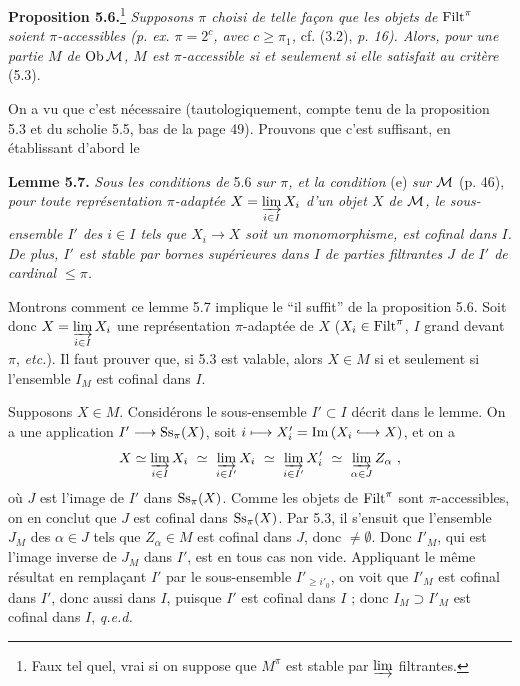 \textbf{Proposition 5.6.}\footnote[21]{Faux tel quel, vrai si on suppose que $M^{\pi}$ est stable par $\varinjlim$ filtrantes.} \textit{Supposons $\pi$ choisi de telle façon que les objets de} $\mathrm{Filt}^{\pi}$ \textit{soient $\pi$-accessibles (p. ex. $\pi = 2^{c}$, avec $c \geq \pi_1$,} cf. (3.2), \textit{p. 16). Alors, pour une partie $M$ de} $\operatorname{Ob}\mathcal{M}$\textit{, $M$ est $\pi$-accessible si et seulement si elle satisfait au critère} (5.3).

On a vu que c'est nécessaire (tautologiquement, compte tenu de la proposition 5.3 et du scholie 5.5, bas de la page 49). Prouvons que c'est suffisant, en établissant d'abord le

\textbf{Lemme 5.7.} \textit{Sous les conditions de} 5.6 \textit{sur $\pi$, et la condition} (e) \textit{sur $\mathcal{M}$} (p. 46), \textit{pour toute représentation $\pi$-adaptée $X = \varinjlim\limits_{i\in I} X_i$ d'un objet $X$ de $\mathcal{M}$, le sous-ensemble $I'$ des $i \in I$ tels que $X_i \longrightarrow X$ soit un monomorphisme, est cofinal dans $I$. De plus, $I'$ est stable par bornes supérieures dans $I$ de parties filtrantes $J$ de $I'$ de cardinal $\leq \pi$.}

Montrons comment ce lemme 5.7 implique le ``il suffit'' de la proposition 5.6. Soit donc $X = \varinjlim\limits_{i\in I} X_i$ une représentation $\pi$-adaptée de $X$ ($X_i \in \mathrm{Filt}^{\pi}$, $I$ grand devant $\pi$, \textit{etc.}). Il faut prouver que, si 5.3 est valable, alors $X \in M$ si et seulement si l'ensemble $I_M$ est cofinal dans $I$.

Supposons $X \in M$. Considérons le sous-ensemble $I' \subset I$ décrit dans le lemme. On a une application $I' \longrightarrow \mathrm{Ss}_{\pi}(X)$, soit $i \longmapsto X'_i = \Img (X_i \hookto X)$, et on a
\[
X \simeq \varinjlim_{i\in I} X_i \ \simeq \ \varinjlim_{i\in I'} X_i \ \simeq \ \varinjlim_{i\in I'} X'_i \ \simeq \ \varinjlim_{\alpha\in J} Z_{\alpha} \ ,
\]
où $J$ est l'image de $I'$ dans $\mathrm{Ss}_{\pi}(X)$. Comme les objets de $\mathrm{Filt}^{\pi}$ sont $\pi$-accessibles, on en conclut que $J$ est cofinal dans $\mathrm{Ss}_{\pi}(X)$. Par 5.3, il s'ensuit que l'ensemble $J_M$ des $\alpha \in J$
tels que $Z_{\alpha} \in M$ est cofinal dans $J$, donc $\neq \emptyset$. Donc $I'_M$, qui est l'image inverse de $J_M$ dans $I'$, est en tous cas non vide. Appliquant le même résultat en remplaçant $I'$ par le sous-ensemble $I'_{\geq i'_0}$, on voit que $I'_M$ est cofinal dans $I'$, donc aussi dans $I$, puisque $I'$ est cofinal dans $I$ ; donc $I_M \supset I'_M$ est cofinal dans $I$, \quad \textit{q.e.d.}

